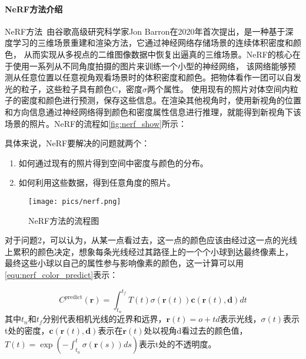 \paragraph{NeRF方法介绍}
NeRF方法~\cite{mildenhall2021nerf}由谷歌高级研究科学家Jon Barron在2020年首次提出，是一种基于深度学习的三维场景重建和渲染方法，它通过神经网络存储场景的连续体积密度和颜色，
从而实现从多视点的二维图像数据中恢复出逼真的三维场景。NeRF的核心在于使用一系列从不同角度拍摄的图片来训练一个小型的神经网络，
该网络能够预测从任意位置以任意视角观看场景时的体积密度和颜色。把物体看作一团可以自发光的粒子，这些粒子具有颜色C，密度$\sigma$两个属性。
使用现有的照片对体空间内粒子的密度和颜色进行预测，保存这些信息。在渲染其他视角时，使用新视角的位置和方向信息通过神经网络得到颜色和密度属性信息进行推理，就能得到新视角下该场景的照片。NeRF的流程如\autoref{fig:nerf_show}所示：
\par 具体来说，NeRF要解决的问题就两个：
\begin{enumerate}
    \item 如何通过现有的照片得到空间中密度与颜色的分布。
    \item 如何利用这些数据，得到任意角度的照片。
\end{enumerate}
\begin{figure}[htbp]
    \centering
    \texttt{[image: pics/nerf.png]}
    \caption{\label{fig:nerf_show}NeRF方法的流程图~\cite{mildenhall2021nerf}}
\end{figure}



对于问题2，可以认为，从某一点看过去，这一点的颜色应该由经过这一点的光线上累积的颜色决定，想象每条光线经过其路径上的一个个小球到达最终像素上，
最终这些小球以自己的属性参与影响像素的颜色，这一计算可以用\autoref{equ:nerf_color_predict}表示：

\begin{equation}
    \label{equ:nerf_color_predict}
    C^{p\text{redict}}(\mathbf{r})=\int_{t_n}^{t_f}T(t)\sigma(\mathbf{r}(t))\mathbf{c}(\mathbf{r}(t),\mathbf{d})dt
\end{equation}
其中$t_n$和$t_f$分别代表相机光线的近界和远界，$\mathbf{r}(t)=o+td$表示光线，$\sigma(t)$表示t处的密度，$\mathbf{c}(\mathbf{r}(t),\mathbf{d})$表示在$\mathbf{r}(t)$处以视角d看过去的颜色值，
$T(t)=\exp{(-\int_{t_n}^t\sigma(\mathbf{r}(s))ds)}$表示t处的不透明度。


